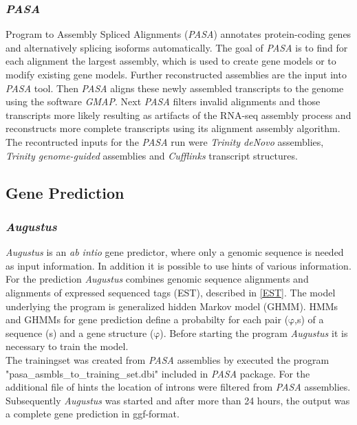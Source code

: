 \documentclass[12pt, a4paper]{report}
\begin{document}
\subsubsection*{\textit{PASA}}
Program to Assembly Spliced Alignments (\textit{PASA}) annotates protein-coding genes and alternatively splicing isoforms automatically. The goal of \textit{PASA} is to find for each alignment the largest assembly, which is used to create gene models or to modify existing gene models. \cite{Haas2003}
Further reconstructed assemblies are the input into \textit{PASA} tool. Then \textit{PASA} aligns these newly assembled transcripts to the genome using the software \textit{GMAP}. Next \textit{PASA} filters invalid alignments and those transcripts more likely resulting as artifacts of the RNA-seq assembly process and reconstructs more complete transcripts using its alignment assembly algorithm. \cite{Haas2011} \\
The recontructed inputs for the \textit{PASA} run were \textit{Trinity deNovo} assemblies, \textit{Trinity genome-guided} assemblies and \textit{Cufflinks} transcript structures. 

\subsection*{Gene Prediction}
\subsubsection{\textit{Augustus}}
\textit{Augustus} is an \textit{ab intio} gene predictor, where only a genomic sequence is needed as input information. In addition it is possible to use hints of various information. For the prediction \textit{Augustus} combines genomic sequence alignments and alignments of expressed sequenced tags (EST), described in \ref{EST}. The model underlying the program is generalized hidden Markov model (GHMM). HMMs and GHMMs for gene prediction define a probabilty for each pair ($\mathrm{\varphi}$,s) of a sequence (s) and a gene structure ($\mathrm{\varphi}$). Before starting the program \textit{Augustus} it is necessary to train the model. \cite{Stanke2006} \\
The trainingset was created from \textit{PASA} assemblies by executed the program "pasa\_asmbls\_to\_training\_set.dbi" included in \textit{PASA} package. For the additional file of hints the location of introns were filtered from \textit{PASA} assemblies. Subsequently \textit{Augustus} was started and after more than 24 hours, the output was a complete gene prediction in ggf-format. 
\end{document}
